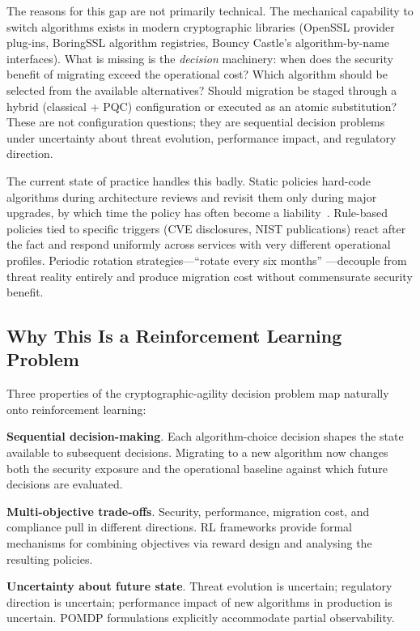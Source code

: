 \documentclass[sigconf,nonacm]{acmart}
\begin{document}
The reasons for this gap are not primarily technical. The mechanical
capability to switch algorithms exists in modern cryptographic
libraries (OpenSSL provider plug-ins, BoringSSL algorithm registries,
Bouncy Castle's algorithm-by-name interfaces). What is missing is the
\emph{decision} machinery: when does the security benefit of migrating
exceed the operational cost? Which algorithm should be selected from
the available alternatives? Should migration be staged through a
hybrid (classical + PQC) configuration or executed as an atomic
substitution? These are not configuration questions; they are
sequential decision problems under uncertainty about threat
evolution, performance impact, and regulatory direction.

The current state of practice handles this badly. Static policies
hard-code algorithms during architecture reviews and revisit them only
during major upgrades, by which time the policy has often become a
liability~\cite{ott2024crypto}. Rule-based policies tied to specific
triggers (CVE disclosures, NIST publications) react after the fact and
respond uniformly across services with very different operational
profiles. Periodic rotation strategies---``rotate every six months''
---decouple from threat reality entirely and produce migration cost
without commensurate security benefit.

\subsection{Why This Is a Reinforcement Learning Problem}

Three properties of the cryptographic-agility decision problem map
naturally onto reinforcement learning:

\textbf{Sequential decision-making}. Each algorithm-choice decision
shapes the state available to subsequent decisions. Migrating to a
new algorithm now changes both the security exposure and the
operational baseline against which future decisions are evaluated.

\textbf{Multi-objective trade-offs}. Security, performance, migration
cost, and compliance pull in different directions. RL frameworks
provide formal mechanisms for combining objectives via reward design
and analysing the resulting policies.

\textbf{Uncertainty about future state}. Threat evolution is uncertain;
regulatory direction is uncertain; performance impact of new
algorithms in production is uncertain. POMDP formulations explicitly
accommodate partial observability.
\end{document}
